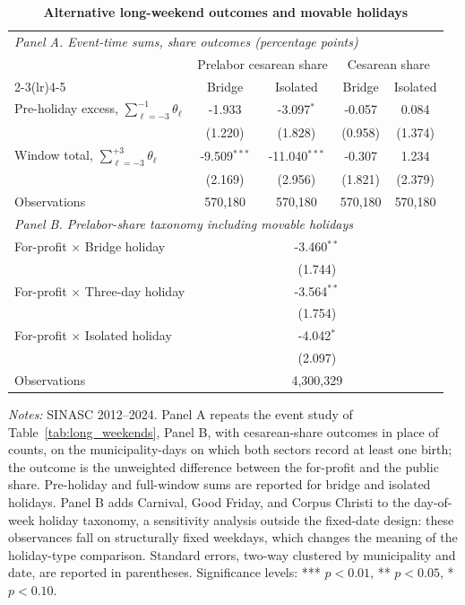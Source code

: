 \begin{table}[H]
\centering
\caption{\textbf{Alternative long-weekend outcomes and movable holidays}}
\label{tab:displacement_robust}
\small\setlength{\tabcolsep}{5pt}
\begin{tabular}{lcccc}
\toprule
\multicolumn{5}{l}{\emph{Panel A. Event-time sums, share outcomes (percentage points)}} \\
\addlinespace[2pt]
 & \multicolumn{2}{c}{Prelabor cesarean share} & \multicolumn{2}{c}{Cesarean share} \\
\cmidrule(lr){2-3}\cmidrule(lr){4-5}
 & Bridge & Isolated & Bridge & Isolated \\
\midrule
Pre-holiday excess, $\sum_{\ell=-3}^{-1}\theta_\ell$ & -1.933 & -3.097$^{*}$ & -0.057 & 0.084 \\
 & (1.220) & (1.828) & (0.958) & (1.374) \\
\addlinespace[2pt]
Window total, $\sum_{\ell=-3}^{+3}\theta_\ell$ & -9.509$^{***}$ & -11.040$^{***}$ & -0.307 & 1.234 \\
 & (2.169) & (2.956) & (1.821) & (2.379) \\
\addlinespace[2pt]
Observations & 570,180 & 570,180 & 570,180 & 570,180 \\
\midrule
\multicolumn{5}{l}{\emph{Panel B. Prelabor-share taxonomy including movable holidays}} \\
\addlinespace[2pt]
For-profit $\times$ Bridge holiday & \multicolumn{4}{c}{-3.460$^{**}$} \\
 & \multicolumn{4}{c}{(1.744)} \\
\addlinespace[2pt]
For-profit $\times$ Three-day holiday & \multicolumn{4}{c}{-3.564$^{**}$} \\
 & \multicolumn{4}{c}{(1.754)} \\
\addlinespace[2pt]
For-profit $\times$ Isolated holiday & \multicolumn{4}{c}{-4.042$^{*}$} \\
 & \multicolumn{4}{c}{(2.097)} \\
\addlinespace[2pt]
Observations & \multicolumn{4}{c}{4,300,329} \\
\bottomrule
\end{tabular}
\begin{minipage}{\linewidth}\footnotesize
\textit{Notes:} SINASC 2012--2024. Panel A repeats the event study of Table~\ref{tab:long_weekends}, Panel B, with cesarean-share outcomes in place of counts, on the municipality-days on which both sectors record at least one birth; the outcome is the unweighted difference between the for-profit and the public share. Pre-holiday and full-window sums are reported for bridge and isolated holidays. Panel B adds Carnival, Good Friday, and Corpus Christi to the day-of-week holiday taxonomy, a sensitivity analysis outside the fixed-date design: these observances fall on structurally fixed weekdays, which changes the meaning of the holiday-type comparison. Standard errors, two-way clustered by municipality and date, are reported in parentheses.
\newline
\footnotesize Significance levels: *** $p<0.01$, ** $p<0.05$, * $p<0.10$.
\end{minipage}
\end{table}
